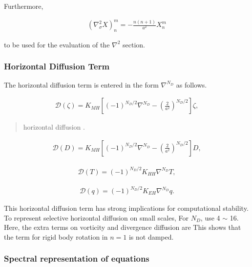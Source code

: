Furthermore,

\begin{eqnarray}
     \left( \nabla^{2}_{\sigma} X \right)_n^m
       =  - \frac{n(n+1)}{a^{2}} X_n^m
\end{eqnarray}

to be used for the evaluation of the \(\nabla^2\) section.

\hypertarget{horizontal-diffusion-term}{%
\subsubsection{Horizontal Diffusion
Term}\label{horizontal-diffusion-term}}

The horizontal diffusion term is entered in the form \(\nabla^{N_D}\) as
follows.

\begin{eqnarray}
  {\mathcal D}(\zeta) = K_{MH}
                      \left[ (-1)^{N_D/2} \nabla^{N_D}
                              - \left( \frac{2}{a^2} \right)^{N_D/2}
                      \right]
                    \zeta ,
\end{eqnarray}

\begin{quote}
\protect\hypertarget{Horizontalux20Diffusion}{}{\blaze{[}horizontal
diffusion }.
\end{quote}

\begin{eqnarray}
     {\mathcal D}(D) = K_{MH}
                      \left[ (-1)^{N_D/2} \nabla^{N_D}
                              - \left( \frac{2}{a^2} \right)^{N_D/2}
                      \right]
                    D ,
\end{eqnarray}

\begin{eqnarray}
    {\mathcal D}(T) = (-1)^{N_D/2} K_{HH} \nabla^{N_D} T ,
\end{eqnarray}

\begin{eqnarray}
    {\mathcal D}(q) = (-1)^{N_D/2} K_{EH} \nabla^{N_D} q .
\end{eqnarray}

This horizontal diffusion term has strong implications for computational
stability. To represent selective horizontal diffusion on small scales,
For \(N_D\), use 4 \(\sim\) 16. Here, the extra terms on vorticity and
divergence diffusion are This shows that the term for rigid body
rotation in \(n=1\) is not damped.

\hypertarget{spectral-representation-of-equations}{%
\subsubsection{Spectral representation of
equations}\label{spectral-representation-of-equations}}

